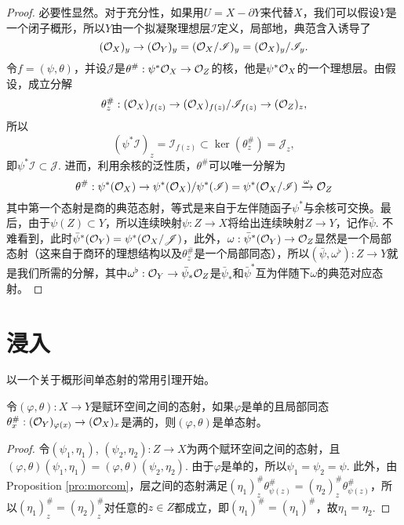 \begin{proof}
必要性显然。对于充分性，如果用$U=X-\partial Y$来代替$X$，我们可以假设$Y$是一个闭子概形，所以$Y$由一个拟凝聚理想层$\mathscr{I}$定义，局部地，典范含入诱导了
\[
	(\mathcal{O}_{X})_{y}\to (\mathcal{O}_Y)_{y}=(\mathcal{O}_{X}/\mathscr{I})_y=(\mathcal{O}_{X})_{y}/\mathscr{I}_y.
\]
令$f=(\psi,\theta)$，并设$\mathscr{J}$是$\theta^\#:\psi^*\mathcal{O}_X\to \mathcal{O}_Z$的核，他是$\psi^*\mathcal{O}_X$的一个理想层。由假设，成立分解
\[
	\theta^\#_z:(\mathcal{O}_X)_{f(z)}\to (\mathcal{O}_{X})_{f(z)}/\mathscr{I}_{f(z)}\to (\mathcal{O}_Z)_z,
\]
所以
\[
	(\psi^*\mathscr I)_z= \mathscr I_{f(z)}\subset \ker(\theta^\#_z)=\mathscr J_z,
\]
即$\psi^* \mathscr I\subset \mathscr J$. 进而，利用余核的泛性质，$\theta^\#$可以唯一分解为
\[
	\theta^\#:\psi^*(\mathcal{O}_X)\to \psi^*(\mathcal{O}_X)/\psi^*(\mathscr I)=\psi^*(\mathcal{O}_X/\mathscr I)\xrightarrow{\omega} \mathcal{O}_Z
\]
其中第一个态射是商的典范态射，等式是来自于左伴随函子$\psi^*$与余核可交换。最后，由于$\psi(Z)\subset Y$，所以连续映射$\psi:Z\to X$将给出连续映射$Z\to Y$，记作$\bar\psi$. 不难看到，此时$\bar \psi^*(\mathcal{O}_Y)=\psi^*(\mathcal{O}_X/\mathscr J)$，此外，$\omega:\bar \psi^*(\mathcal{O}_Y)\to \mathcal{O}_Z$显然是一个局部态射（这来自于商环的理想结构以及$\theta^\#_z$是一个局部同态），所以$(\bar\psi,\omega^\flat):Z\to Y$就是我们所需的分解，其中$\omega^\flat:\mathcal{O}_Y\to \bar\psi_*\mathcal{O}_Z$是$\bar\psi_*$和$\bar\psi^*$互为伴随下$\omega$的典范对应态射。
\end{proof}

\section{浸入}

以一个关于概形间单态射的常用引理开始。

\begin{lem}\label{lem:3.4.1}
	令$(\varphi,\theta):X\to Y$是赋环空间之间的态射，如果$\varphi$是单的且局部同态$\theta^\#_x:(\mathcal{O}_Y)_{\varphi(x)}\to (\mathcal{O}_X)_x$是满的，则$(\varphi,\theta)$是单态射。
\end{lem}

\begin{proof}
	令$(\psi_1,\eta_1)$, $(\psi_2,\eta_2):Z\to X$为两个赋环空间之间的态射，且$(\varphi,\theta)(\psi_1,\eta_1)=(\varphi,\theta)(\psi_2,\eta_2)$. 由于$\varphi$是单的，所以$\psi_1=\psi_2=\psi$. 此外，由Proposition \ref{pro:morcom}，层之间的态射满足$(\eta_1)^\#_z\theta^\#_{\psi(z)}=(\eta_2)^\#_z\theta^\#_{\psi(z)}$，所以$(\eta_1)^\#_z=(\eta_2)^\#_z$对任意的$z\in Z$都成立，即$(\eta_1)^\#=(\eta_1)^\#$，故$\eta_1=\eta_2$. 
\end{proof}


